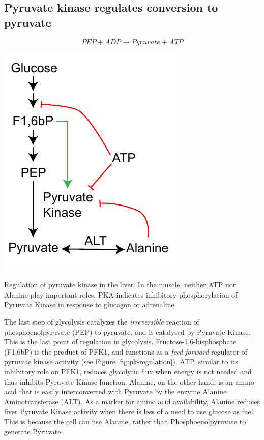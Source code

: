 \documentclass{tufte-handout}
\begin{document}
\subsection{Pyruvate kinase regulates conversion to pyruvate}

\begin{equation}\label{eq:pk}
PEP + ADP \rightarrow Pyruvate + ATP
\end{equation}

\begin{marginfigure}
\includegraphics{figures/pk-regulation.pdf}
\caption{Regulation of pyruvate kinase in the liver.  In the muscle, neither ATP nor Alanine play important roles.  PKA indicates inhibitory phosphorylation of Pyruvate Kinase in response to glucagon or adrenaline.}
\label{fig:pk-regulation}
\end{marginfigure}

The last step of glycolysis catalyzes the \emph{irreversible} reaction of phosphoenolpyruvate (PEP) to pyruvate, and is catalysed by Pyruvate Kinase.  This is the last point of regulation in glycolysis.    Fructose-1,6-bisphosphate (F1,6bP) is the product of PFK1, and functions as a \emph{feed-forward} regulator of pyruvate kinase activity (see Figure \ref{fig:pk-regulation}).  ATP, similar to its inhibitory role on PFK1, reduces glycolytic flux when energy is not needed and thus inhibits Pyruvate Kinase function.  Alanine, on the other hand, is an amino acid that is easily interconverted with Pyruvate by the enzyme Alanine Aminotransferase (ALT).  As a marker for amino acid availability, Alanine reduces liver Pyruvate Kinase activity when there is less of a need to use glucose as fuel.  This is because the cell can use Alanine, rather than Phosphoenolpyruvate to generate Pyruvate.
\end{document}
